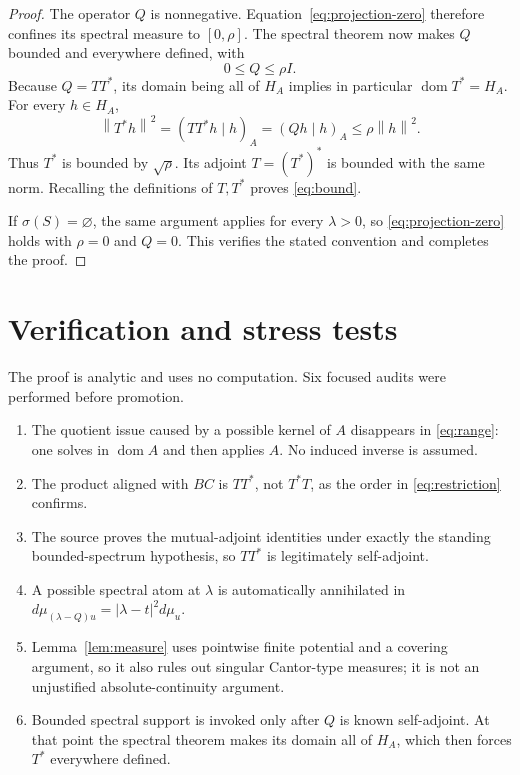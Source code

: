 \documentclass[11pt]{article}
\newcommand{\Hh}{H_A}
\newcommand{\domA}{\operatorname{dom}A}
\newcommand{\norm}[1]{\left\lVert#1\right\rVert}
\begin{document}
\begin{proof}
The operator \(Q\) is nonnegative.  Equation~\eqref{eq:projection-zero}
therefore confines its spectral measure to \([0,\rho]\).  The spectral
theorem now makes \(Q\) bounded and everywhere defined, with
\[
 0\le Q\le\rho I.
\]
Because \(Q=TT^*\), its domain being all of \(\Hh\) implies in particular
\(\operatorname{dom}T^*=\Hh\).  For every \(h\in\Hh\),
\[
 \norm{T^*h}^2
 =(TT^*h\mid h)_A
 =(Qh\mid h)_A
 \le\rho\norm h^2.
\]
Thus \(T^*\) is bounded by \(\sqrt\rho\).  Its adjoint
\(T=(T^*)^*\) is bounded with the same norm.  Recalling the definitions of
\(T,T^*\) proves \eqref{eq:bound}.

If \(\sigma(S)=\varnothing\), the same argument applies for every
\(\lambda>0\), so \eqref{eq:projection-zero} holds with \(\rho=0\) and
\(Q=0\).  This verifies the stated convention and completes the proof.
\end{proof}

\section*{Verification and stress tests}

The proof is analytic and uses no computation.  Six focused audits were
performed before promotion.

\begin{enumerate}
 \item The quotient issue caused by a possible kernel of \(A\) disappears in
 \eqref{eq:range}: one solves in \(\domA\) and then applies \(A\).  No induced
 inverse is assumed.
 \item The product aligned with \(BC\) is \(TT^*\), not \(T^*T\), as the
 order in \eqref{eq:restriction} confirms.
 \item The source proves the mutual-adjoint identities under exactly the
 standing bounded-spectrum hypothesis, so \(TT^*\) is legitimately
 self-adjoint.
 \item A possible spectral atom at \(\lambda\) is automatically annihilated
 in \(d\mu_{(\lambda-Q)u}=|\lambda-t|^2d\mu_u\).
 \item Lemma~\ref{lem:measure} uses pointwise finite potential and a covering
 argument, so it also rules out singular Cantor-type measures; it is not an
 unjustified absolute-continuity argument.
 \item Bounded spectral support is invoked only after \(Q\) is known
 self-adjoint.  At that point the spectral theorem makes its domain all of
 \(\Hh\), which then forces \(T^*\) everywhere defined.
\end{enumerate}
\end{document}
